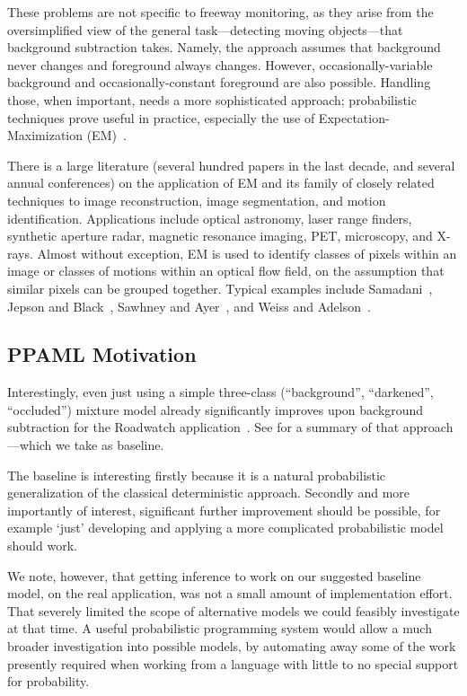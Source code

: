 These problems are not specific to freeway monitoring, as they arise
from the oversimplified view of the 
general task---detecting moving objects---that
background subtraction takes.  Namely, the approach assumes that
background never changes and foreground always changes.  However,
occasionally-variable background and occasionally-constant
foreground are also possible.  Handling those, when important, needs a
more sophisticated approach; probabilistic techniques prove useful in practice,
especially the use of Expectation-Maximization (EM)~\cite{Dempster+al:1977}.

There is a large literature (several hundred papers in the last
decade, and several annual conferences) on the application
of EM and its family of closely related techniques
to image reconstruction, image segmentation, and
motion identification.   Applications include optical astronomy, laser
range finders, synthetic aperture radar, magnetic resonance imaging, PET, microscopy, and
X-rays.  Almost without exception, EM is used to identify classes of
pixels within an image or classes of motions within an optical flow
field, on the assumption that similar pixels can be grouped
together. Typical examples include Samadani~\cite{Samadani:1995},
Jepson and Black~\cite{Jepson+Black:1993}, Sawhney and
Ayer~\cite{Sawhney+Ayer:1996}, and Weiss and
Adelson~\cite{Weiss+Adelson:1996}.

\subsection{PPAML Motivation}

Interestingly, even just using a simple three-class (``background'', ``darkened'',
``occluded'') mixture model already significantly improves upon
background subtraction for the Roadwatch application~\cite{friedman97uai}.  See
 for a summary of
that approach---which we take as baseline.

The baseline is interesting firstly because it is a natural
probabilistic generalization of the 
classical deterministic approach.
Secondly and more importantly of interest, significant further
improvement should be possible, for example `just' developing and
applying a more complicated probabilistic model should work.

We note, however, that getting inference to work on our suggested baseline
model, on the real application, was not a small amount of
implementation effort.  That severely limited the scope of alternative models we could
feasibly investigate at that time.  A useful probabilistic programming
system would allow a much broader investigation into possible models,
by automating away some of the work presently required when working
from a language with little to no special support for probability.


